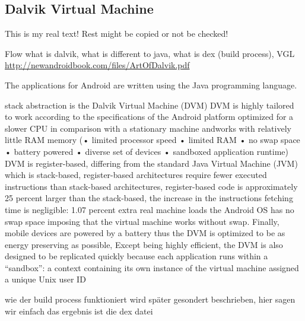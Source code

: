 \subsection{Dalvik Virtual Machine} \label{subsection:android-dalvik}
This is my real text! Rest might be copied or not be checked!

Flow what is dalvik, what is different to java, what is dex (build process), VGL \url{http://newandroidbook.com/files/ArtOfDalvik.pdf}\newline

%
The applications for Android are written using the Java programming language.

stack abstraction is the Dalvik Virtual Machine (DVM)\newline
DVM is highly tailored to work according to the specifications of the Android platform\newline
optimized for a slower CPU in comparison with a stationary machine andworks with relatively little RAM memory (• limited processor speed
• limited RAM
• no swap space
• battery powered
• diverse set of devices
• sandboxed application runtime)\cite{ehringerDalvik}\newline
DVM is register-based, differing from the standard Java Virtual Machine (JVM) which is stack-based, register-based architectures require fewer executed instructions than stack-based architectures, register-based code is approximately 25 percent larger than the stack-based, the increase in the instructions fetching time is negligible: 1.07 percent extra real machine loads\cite{ehringerDalvik}\newline
the Android OS has no swap space imposing that the virtual machine works without swap. Finally, mobile devices are powered by a battery thus the DVM is optimized to be as energy preserving as possible, Except being highly efficient, the DVM is also designed to be replicated quickly because each application runs within a “sandbox”: a context containing its own instance of the virtual machine assigned a unique Unix user ID\newline

wie der build process funktioniert wird später gesondert beschrieben, hier sagen wir einfach das ergebnis ist die dex datei\newline

\cite{kovachevaMaster} \cite{ehringerDalvik}
%

